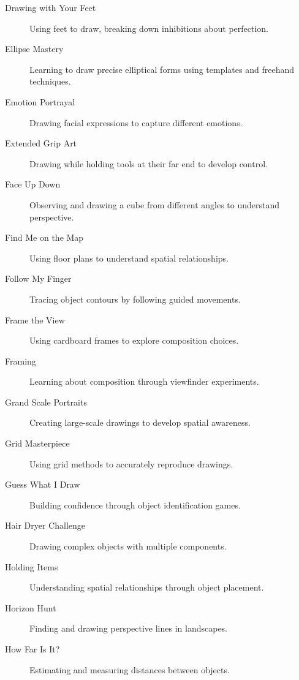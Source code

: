 \documentclass{article}
\begin{document}
\begin{description}
    \item[Drawing with Your Feet] Using feet to draw, breaking down inhibitions about perfection.

    \item[Ellipse Mastery] Learning to draw precise elliptical forms using templates and freehand techniques.
    
    \item[Emotion Portrayal] Drawing facial expressions to capture different emotions.
    
    \item[Extended Grip Art] Drawing while holding tools at their far end to develop control.
    
    \item[Face Up Down] Observing and drawing a cube from different angles to understand perspective.
    
    \item[Find Me on the Map] Using floor plans to understand spatial relationships.
    
    \item[Follow My Finger] Tracing object contours by following guided movements.
    
    \item[Frame the View] Using cardboard frames to explore composition choices.
    
    \item[Framing] Learning about composition through viewfinder experiments.
    
    \item[Grand Scale Portraits] Creating large-scale drawings to develop spatial awareness.
    
    \item[Grid Masterpiece] Using grid methods to accurately reproduce drawings.
    
    \item[Guess What I Draw] Building confidence through object identification games.
    
    \item[Hair Dryer Challenge] Drawing complex objects with multiple components.
    
    \item[Holding Items] Understanding spatial relationships through object placement.
    
    \item[Horizon Hunt] Finding and drawing perspective lines in landscapes.
    
    \item[How Far Is It?] Estimating and measuring distances between objects.
    

\end{description}
\end{document}
